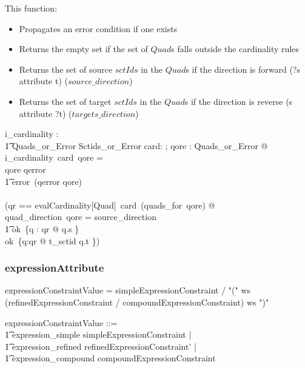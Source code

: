 \documentclass{article}
\def\bnf#1{{\scriptsize {{#1}} }}
\begin{document}
This function:
\begin{itemize}[noitemsep,nolistsep]
\item Propagates an error condition if one exists
\item Returns the empty set if the set of $Quad$s falls outside the cardinality rules
\item Returns the set of source $sctIds$ in the $Quad$s if the direction is forward (?s attribute t) ($source\_direction$)
\item Returns the set of target $sctIds$ in the $Quad$s if the direction is reverse (s attribute ?t) ($targets\_direction$)
\end{itemize}

\begin{gendef}
   i\_cardinality :  \\
\t1 \optional[cardinality] \fun Quads\_or\_Error \fun  Sctids\_or\_Error
\where
   \forall card: \optional[cardinality]; qore : Quads\_or\_Error  @ \\
i\_cardinality~card~qore = \\
\IF qore \in \ran qerror \\
\t1 \THEN error~(qerror \inv qore) \\
\ELSE  \\
   (\LET qr == evalCardinality[Quad]~card~(quads\_for~qore) @ \\
\IF quad\_direction~qore = source\_direction \\
\t1 \THEN ok~\{q : qr @ q.s \} \\
\ELSE ok~\{q:qr @ t\_sctid \inv q.t \})
\end{gendef}

\subsubsection{expressionAttribute}

\begin{framed}
\noindent
\bnf{expressionConstraintValue = simpleExpressionConstraint / "(" ws (refinedExpressionConstraint / compoundExpressionConstraint) ws ")"}
\end{framed}

\begin{zed}
expressionConstraintValue ::= \\
\t1 expression\_simple \ldata simpleExpressionConstraint \rdata | \\
\t1 expression\_refined \ldata refinedExpressionConstraint' \rdata | \\
\t1 expression\_compound \ldata compoundExpressionConstraint \rdata
\end{zed}
\end{document}
